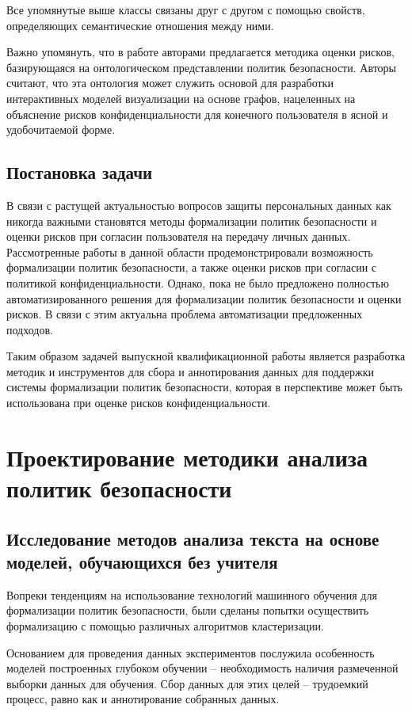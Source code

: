 \documentclass[../main]{subfiles}
\begin{document}
Все упомянутые выше классы связаны друг с другом с помощью свойств, определяющих семантические отношения между ними.

Важно упомянуть, что в работе \cite{P2Onto} авторами предлагается методика оценки рисков, базирующаяся на онтологическом представлении политик безопасности. Авторы \cite{P2Onto} считают, что эта онтология может служить основой для разработки интерактивных моделей визуализации на основе графов, нацеленных на объяснение рисков конфиденциальности для конечного пользователя в ясной и удобочитаемой форме. 

\subsection{Постановка задачи}
В связи с растущей актуальностью вопросов защиты персональных данных как никогда важными становятся методы формализации политик безопасности и оценки рисков при согласии пользователя на передачу личных данных. Рассмотренные работы в данной области продемонстрировали возможность формализации политик безопасности, а также оценки рисков при согласии с политикой конфиденциальности. Однако, пока не было предложено полностью автоматизированного решения для формализации политик безопасности и оценки рисков. В связи с этим актуальна проблема автоматизации предложенных подходов. 

Таким образом задачей выпускной квалификационной работы является разработка методик и инструментов для сбора и аннотирования данных для поддержки системы формализации политик безопасности, которая в перспективе может быть использована при оценке рисков конфиденциальности.

\newpage
\section{Проектирование методики анализа политик безопасности}

\subsection{Исследование методов анализа текста на основе моделей, обучающихся без учителя}

Вопреки тенденциям на использование технологий машинного обучения для формализации политик безопасности, были сделаны попытки осуществить формализацию с помощью различных алгоритмов кластеризации.

Основанием для проведения данных экспериментов послужила особенность моделей построенных глубоком обучении -- необходимость наличия размеченной выборки данных для обучения. Сбор данных для этих целей -- трудоемкий процесс, равно как и аннотирование собранных данных.
\end{document}
